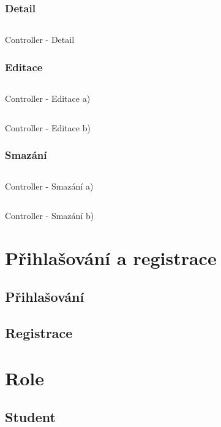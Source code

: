 \documentclass[a4paper, 12pt]{report}
\begin{document}
		\subsection{Detail}
	\begin{listing}[H]
		\inputminted{csharp}{SourceCode/Controllers/Detail.cs}
		\caption{Controller - Detail}
		\label{Detail}
	\end{listing}
		\subsection{Editace}
	\begin{listing}[H]
	\inputminted{csharp}{SourceCode/Controllers/Edit.cs}
	\caption{Controller - Editace a)}
	\label{Edit}
	\end{listing}

	\begin{listing}[H]
	\inputminted{csharp}{SourceCode/Controllers/Edit_Post.cs}
	\caption{Controller - Editace b)}
	\label{Edit_Post}
	\end{listing}
		\subsection{Smazání}
	\begin{listing}[H]
	\inputminted{csharp}{SourceCode/Controllers/Delete.cs}
	\caption{Controller - Smazání a)}
	\label{Delete}
	\end{listing}
	\begin{listing}[H]
	\inputminted{csharp}{SourceCode/Controllers/Delete_Post.cs}
	\caption{Controller - Smazání b)}
	\label{Delete_Post}
	\end{listing}
	
	
	\chapter{Přihlašování a registrace}
	\section{Přihlašování}
	\section{Registrace}

	\chapter{Role} \label{Role}
	\section{Student}
\end{document}
